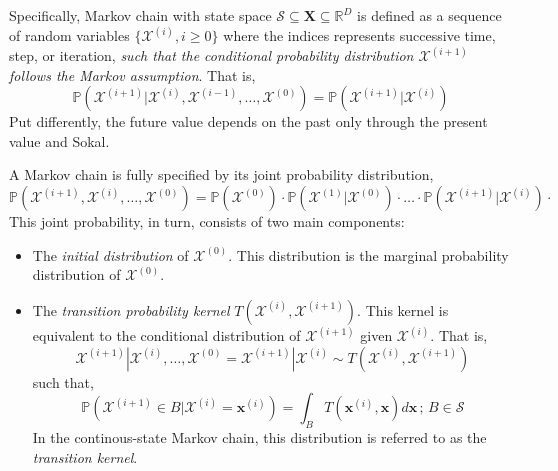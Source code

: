 Specifically, Markov chain with state space $\mathcal{S} \subseteq \mathbf{X} \subseteq \mathbb{R}^D$ is defined as a sequence of random variables $\{\bm{\mathcal{X}}^{(i)}, i \geq 0\}$ where the indices represents successive time, step, or iteration,
\emph{such that the conditional probability distribution $\bm{\mathcal{X}}^{(i+1)}$ follows the Markov assumption}.
That is,
\begin{equation}
  \mathbb{P}(\bm{\mathcal{X}}^{(i+1)} | \bm{\mathcal{X}}^{(i)}, \bm{\mathcal{X}}^{(i-1)}, \ldots, \bm{\mathcal{X}}^{(0)}) = \mathbb{P}(\bm{\mathcal{X}}^{(i+1)} | \bm{\mathcal{X}}^{(i)})
\label{eq:markov_property}
\end{equation}
Put differently, the future value depends on the past only through the present value \cite{Geyer2011} and Sokal.

A Markov chain is fully specified by its joint probability distribution,
\begin{equation}
  \mathbb{P}(\bm{\mathcal{X}}^{(i+1)}, \bm{\mathcal{X}}^{(i)}, \ldots, \bm{\mathcal{X}}^{(0)}) = \mathbb{P}(\bm{\mathcal{X}}^{(0)}) \cdot \mathbb{P}(\bm{\mathcal{X}}^{(1)} | \bm{\mathcal{X}}^{(0)}) \cdot \ldots \cdot \mathbb{P}(\bm{\mathcal{X}}^{(i+1)} | \bm{\mathcal{X}}^{(i)}) \cdot
\label{eq:markov_chain_joint_probability}
\end{equation}
This joint probability, in turn, consists of two main components:
\begin{itemize}
	\item The \emph{initial distribution} of $\bm{\mathcal{X}}^{(0)}$. This distribution is the marginal probability distribution of $\bm{\mathcal{X}}^{(0)}$.
	
	\item The \emph{transition probability kernel} $T(\bm{\mathcal{X}}^{(i)}, \bm{\mathcal{X}}^{(i+1)})$.
	This kernel is equivalent to the conditional distribution of $\bm{\mathcal{X}}^{(i+1)}$ given $\bm{\mathcal{X}}^{(i)}$. That is,
\begin{equation}
  \bm{\mathcal{X}}^{(i+1)} | \bm{\mathcal{X}}^{(i)}, \ldots, \bm{\mathcal{X}}^{(0)} = \bm{\mathcal{X}}^{(i+1)} | \bm{\mathcal{X}}^{(i)} \sim T(\bm{\mathcal{X}}^{(i)}, \bm{\mathcal{X}}^{(i+1)})
\label{eq:markov_chain_transition_kernel}
\end{equation}
	such that,
	\begin{equation}
  \mathbb{P}(\bm{\mathcal{X}}^{(i+1)} \in B | \bm{\mathcal{X}}^{(i)} = \bm{x}^{(i)}) = \int_B T(\bm{x}^{(i)}, \bm{x}) d\bm{x} \, ; \, B \in \mathcal{S}
\label{eq:markov_chain_transition_probability}
\end{equation}
	In the continous-state Markov chain, this distribution is referred to as the \emph{transition kernel}.

\end{itemize}

